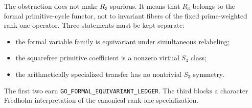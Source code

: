 The obstruction does not make $R_3$ spurious.  It means that $R_3$ belongs to
the formal primitive-cycle functor, not to invariant fibers of the fixed
prime-weighted rank-one operator.  Three statements must be kept separate:

\begin{itemize}
\item the formal variable family is equivariant under simultaneous relabeling;
\item the squarefree primitive coefficient is a nonzero virtual $S_3$ class;
\item the arithmetically specialized transfer has no nontrivial $S_3$ symmetry.
\end{itemize}

The first two earn \texttt{GO\_FORMAL\_EQUIVARIANT\_LEDGER}.  The third
blocks a character Fredholm interpretation of the canonical rank-one
specialization.
